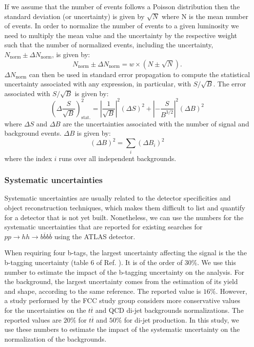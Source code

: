 If we assume that the number of events follows a Poisson distribution then the standard deviation (or uncertainty) is given by $\sqrt{N}$ where N is the mean number of events. In order to normalize the number of events to a given luminosity we need to multiply the mean value and the uncertainty by the respective weight such that the number of normalized events, including the uncertainty, $N_{\text{norm}}\pm \Delta N_{\text{norm}}$, is given by:
\begin{equation}
	N_{\text{norm}}\pm \Delta N_{\text{norm}}=w\times \left(N \pm \sqrt{N}\right).
\end{equation}
$\Delta N_{\text{norm}}$ can then be used in standard error propagation to compute the statistical uncertainty associated with any expression, in particular, with $S/\sqrt{B}$. The error associated with $S/\sqrt{B}$ is given by:
\begin{equation}
	\left(\Delta\frac{S}{\sqrt{B}}\right)_{\text{stat.}}^2=\left|\frac{1}{\sqrt{B}}\right|^2 (\Delta S)^2+\left|-\frac{S}{B^{3/2}}\right|^2 (\Delta B)^2
\end{equation}
where $\Delta S$ and $\Delta B$ are the uncertainties associated with the number of signal and background events. $\Delta B$ is given by:
\begin{equation}
		(\Delta B)^2 =\sum_i (\Delta B_i)^2
\end{equation}
where the index $i$ runs over all independent backgrounds.

\subsubsection{Systematic uncertainties}

Systematic uncertainties are usually related to the detector specificities and object reconstruction techniques, which makes them difficult to list and quantify for a detector that is not yet built. Nonetheless, we can use the numbers for the systematic uncertainties that are reported for existing searches for $pp\rightarrow hh\rightarrow b\overline{b}b\overline{b}$ using the ATLAS detector.

When requiring four b-tags, the largest uncertainty affecting the signal is the the b-tagging uncertainty (table 6 of Ref. \cite{hh2bbbbATLAS1}). It is of the order of $30\%$. We use this number to estimate the impact of the b-tagging uncertainty on the analysis.
For the background, the largest uncertainty comes from the estimation of its yield and shape, according to the same reference. The reported value is $16\%$. However, a study performed by the FCC study group \cite{FCCphysClement} considers more conservative values for the uncertainties on the $t\overline{t}$ and  QCD di-jet backgrounds normalizations. The reported values are $20\%$ for $t\overline{t}$ and $50\%$ for di-jet production. In this study, we use these numbers to estimate the impact of the systematic uncertainty on the normalization of the backgrounds.

